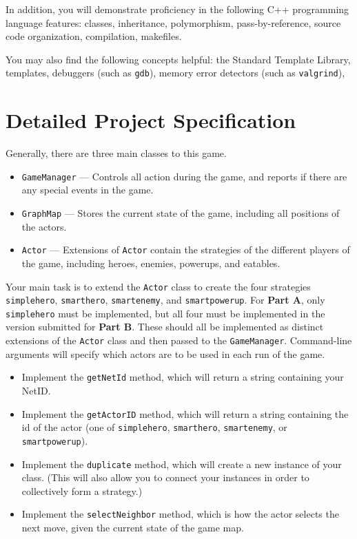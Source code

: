 \documentclass[11pt]{article}
\begin{document}
In addition, you will demonstrate proficiency in the following C++ programming language features:
classes,
inheritance,
polymorphism,
pass-by-reference,
source code organization,
compilation,
makefiles.

You may also find the following concepts helpful:
the Standard Template Library,
templates, 
debuggers (such as \texttt{gdb}),
memory error detectors (such as \texttt{valgrind}),


\section{Detailed Project Specification}\label{sec:specification}

Generally, there are three main classes to this game.

\begin{itemize}
\item \texttt{GameManager} --- Controls all action during the game, and reports if there are any special events in the game.
\item \texttt{GraphMap} --- Stores the current state of the game, including all positions of the actors.
\item \texttt{Actor} --- Extensions of \texttt{Actor} contain the strategies of the different players of the game, including heroes, enemies, powerups, and eatables.
\end{itemize}

Your main task is to extend the \texttt{Actor} class to create the four strategies \texttt{simplehero}, \texttt{smarthero}, \texttt{smartenemy}, and \texttt{smartpowerup}.
For \textbf{Part A}, only \texttt{simplehero} must be implemented, but all four must be implemented in the version submitted for \textbf{Part B}.
These should all be implemented as distinct extensions of the \texttt{Actor} class and then passed to  the \texttt{GameManager}.
Command-line arguments will specify which actors are to be used in each run of the game.

\begin{itemize}
\item Implement the \texttt{getNetId} method, which will return a string containing your NetID.
\item Implement the \texttt{getActorID} method, which will return a string containing the id of the actor (one of \texttt{simplehero}, \texttt{smarthero}, \texttt{smartenemy}, or \texttt{smartpowerup}).
\item Implement the \texttt{duplicate} method, which will create a new instance of your class. (This will also allow you to connect your instances in order to collectively form a strategy.)
\item Implement the \texttt{selectNeighbor} method, which is how the actor selects the next move, given the current state of the game map.
\end{itemize}
\end{document}
